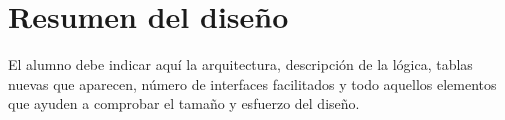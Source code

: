 \section{\forlnameref Resumen del diseño}
\label{sec:designResume}

\begin{shaded}
El alumno debe indicar aquí la arquitectura, descripción de la lógica, tablas nuevas que aparecen, número de interfaces facilitados y todo aquellos elementos que ayuden a comprobar el tamaño y esfuerzo del diseño.
\end{shaded}